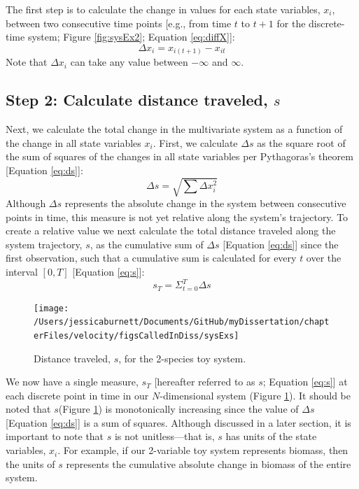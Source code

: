 \documentclass[12pt,twoside,openany]{reedthesis}
\begin{document}
The first step is to calculate the change in values for each state variables, \(x_i\), between two consecutive time points {[}e.g., from time \(t\) to \(t+1\) for the discrete-time system; Figure \ref{fig:sysEx2}; Equation \eqref{eq:diffX}{]}:
\begin{equation}
\Delta x_i = x_{i(t+1)} - x_{it} 
\label{eq:diffX}
\end{equation}
Note that \(\Delta x_i\) can take any value between \(-\infty\) and \(\infty\).

\hypertarget{step-2-calculate-distance-traveled-s}{%
\subsection{\texorpdfstring{Step 2: Calculate distance traveled, \(s\)}{Step 2: Calculate distance traveled, s}}\label{step-2-calculate-distance-traveled-s}}

Next, we calculate the total change in the multivariate system as a function of the change in all state variables \(x_i\). First, we calculate \(\Delta s\) as the square root of the sum of squares of the changes in all state variables per Pythagoras's theorem {[}Equation \eqref{eq:ds}{]}:
\begin{equation}
\Delta s = \sqrt{\sum{\Delta x_i^2}}
\label{eq:ds}
\end{equation}
Although \(\Delta s\) represents the absolute change in the system between consecutive points in time, this measure is not yet relative along the system's trajectory. To create a relative value we next calculate the total distance traveled along the system trajectory, \(s\), as the cumulative sum of \(\Delta s\) {[}Equation \eqref{eq:ds}{]} since the first observation, such that a cumulative sum is calculated for every \(t\) over the interval \([0,T]\) {[}Equation \eqref{eq:s}{]}:
\begin{equation}
s_T = \Sigma_{t=0}^{T}{\Delta s}
  \label{eq:s}
\end{equation}
\begin{figure}
\texttt{[image: /Users/jessicaburnett/Documents/GitHub/myDissertation/chapterFiles/velocity/figsCalledInDiss/sysExs]} \caption{Distance traveled, $s$, for the 2-species toy system.}\label{fig:sysExs}
\end{figure}
We now have a single measure, \(s_T\) {[}hereafter referred to as \(s\); Equation \eqref{eq:s}{]} at each discrete point in time in our \(N\)-dimensional system (Figure \ref{fig:sysExs}). It should be noted that \(s\)(Figure \ref{fig:sysExs}) is monotonically increasing since the value of \(\Delta s\) {[}Equation \eqref{eq:ds}{]} is a sum of squares. Although discussed in a later section, it is important to note that \(s\) is not unitless---that is, \(s\) has units of the state variables, \(x_i\). For example, if our 2-variable toy system represents biomass, then the units of \(s\) represents the cumulative absolute change in biomass of the entire system.
\end{document}
